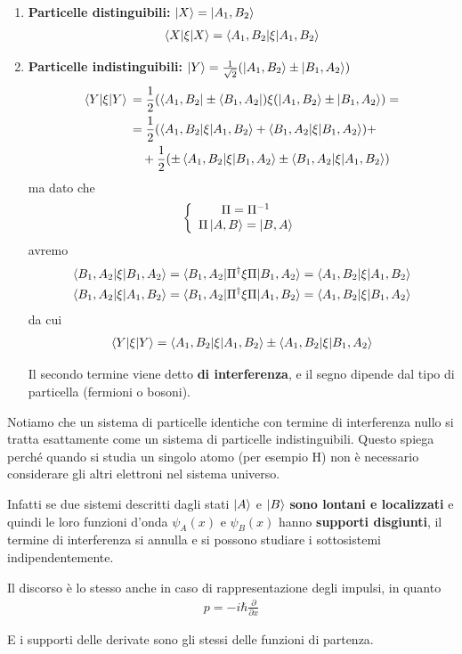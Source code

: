 \begin{enumerate}
	\item \textbf{Particelle distinguibili:} $\ket{X}=\ket{A_1,B_2}$
	\begin{align}
	\braket{X|\xi|X}= \braket{A_1,B_2|\xi|A_1,B_2}
	\end{align}
	
	\item \textbf{Particelle indistinguibili:} $\ket{Y}=\frac{1}{\sqrt{2}}(\ket{A_1,B_2} \pm \ket{B_1,A_2})$	
		\begin{align}
		\braket{Y|\xi|Y} {}&= \frac{1}{2}(\bra{A_1,B_2} \pm \bra{B_1,A_2})\xi(\ket{A_1,B_2} \pm \ket{B_1,A_2}) = \nonumber \\
		&= \frac{1}{2}(\braket{A_1,B_2 |\xi| A_1,B_2} + \braket{B_1,A_2 |\xi| B_1,A_2}) + \nonumber \\
		&\quad + \frac{1}{2}(\pm \braket{A_1,B_2 |\xi| B_1,A_2} \pm \braket{B_1,A_2 |\xi| A_1,B_2})
		\end{align}
		ma dato che 
		\begin{align}
		\left\{
		\begin{array}{cc}
		\Pi=\Pi^{-1} \\
		\Pi\ket{A,B}=\ket{B,A}
		\end{array}		
		\right. 
		\end{align}
		avremo 
		\begin{align}	
		\braket{B_1,A_2|\xi|B_1,A_2}=\braket{B_1,A_2|\Pi^\dagger\xi\Pi|B_1,A_2}= \braket{A_1,B_2|\xi|A_1,B_2} \\
		\braket{B_1,A_2|\xi|A_1,B_2}= \braket{B_1,A_2|\Pi^\dagger\xi\Pi|A_1,B_2}= \braket{A_1,B_2|\xi|B_1,A_2}
		\end{align}
		da cui
		\begin{align}
		\braket{Y|\xi|Y} = \braket{A_1,B_2 |\xi| A_1,B_2} \pm \braket{A_1,B_2 |\xi| B_1,A_2}
		\end{align}
				
		Il secondo termine viene detto \textbf{di interferenza}, e il segno dipende dal tipo di particella (fermioni o bosoni).
\end{enumerate}

Notiamo che un sistema di particelle identiche con termine di interferenza nullo si tratta esattamente come un sistema di particelle indistinguibili. Questo spiega perché quando si studia un singolo atomo (per esempio H) non è necessario considerare gli altri elettroni nel sistema universo. 

Infatti se due sistemi descritti dagli stati $\ket{A}$ e $\ket{B}$ \textbf{sono lontani e localizzati} e quindi le loro funzioni d'onda $\psi_A(x)$ e $\psi_B(x)$ hanno \textbf{supporti disgiunti}, il termine di interferenza si annulla e si possono studiare i sottosistemi indipendentemente.

Il discorso è lo stesso anche  in caso di rappresentazione degli impulsi, in quanto
\begin{align}
p=-i \hbar \frac{\partial}{\partial x}
\end{align}

E i supporti delle derivate sono gli stessi delle funzioni di partenza. 